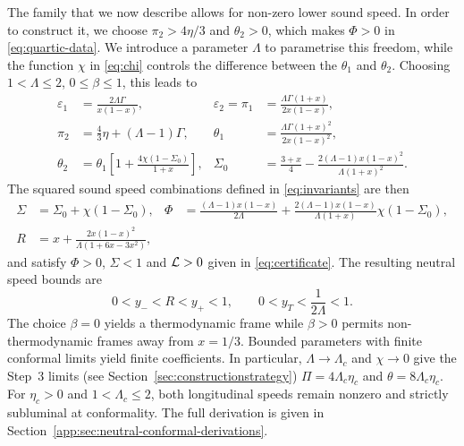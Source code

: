 The family  that we now describe allows for non-zero lower sound speed. In order to construct it, 
we choose $\pi_2>4\eta/3$ and $\theta_2>0$,
which makes $\Phi>0$ in \eqref{eq:quartic-data}. We introduce a parameter
$\Lambda$ to parametrise this freedom, while the function $\chi$ in
\eqref{eq:chi} controls the difference between the $\theta_1$ and $\theta_2$. Choosing $1<\Lambda\leq2$, $0\leq\beta\leq1$, this leads to
\begin{align}
 \varepsilon_1&=\frac{2\Lambda\Gamma}{x(1-x)},&
 \varepsilon_2=\pi_1&=\frac{\Lambda\Gamma(1+x)}{2x(1-x)},\nonumber\\
 \pi_2&=\frac43\eta+(\Lambda-1)\Gamma,&
 \theta_1&=\frac{\Lambda\Gamma(1+x)^2}{2x(1-x)^2},\nonumber\\
 \theta_2&=\theta_1\left[1+\frac{4\chi(1-\Sigma_0)}{1+x}\right],&
 \Sigma_0&=\frac{3+x}{4}
 -\frac{2(\Lambda-1)x(1-x)^2}{\Lambda(1+x)^2}.
 \label{eq:AN}
\end{align}
The squared sound speed combinations defined in \eqref{eq:invariants} are
then
\begin{align}
 \Sigma&=\Sigma_0+\chi(1-\Sigma_0),&
 \Phi&=\frac{(\Lambda-1)x(1-x)}{2\Lambda}
       +\frac{2(\Lambda-1)x(1-x)}{\Lambda(1+x)}\chi(1-\Sigma_0),
       \nonumber\\
 R&=x+\frac{2x(1-x)^2}{\Lambda(1+6x-3x^2)},\label{eq:AN-speeds}
\end{align}
and satisfy $\Phi>0$, $\Sigma<1$ and $\mathcal L>0$ given in \eqref{eq:certificate}. The resulting neutral speed bounds are
\begin{equation}\label{eq:AN-bounds}
 0<y_-<R<y_+<1,\qquad 0<y_T<\frac1{2\Lambda}<1.
\end{equation}
The choice
$\beta=0$ yields a thermodynamic frame while $\beta>0$ permits
non-thermodynamic frames away from $x=1/3$. Bounded parameters with
finite conformal limits yield finite coefficients. In particular,
$\Lambda\to\Lambda_c$ and $\chi\to0$ give the Step~3 limits (see Section~\ref{sec:constructionstrategy})
$\Pi=4\Lambda_c\eta_c$ and $\theta=8\Lambda_c\eta_c$.
For $\eta_c>0$ and $1<\Lambda_c\leq2$, both longitudinal speeds
remain nonzero and strictly subluminal at conformality. The full derivation
is given in Section~\ref{app:sec:neutral-conformal-derivations}.

